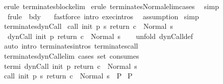 \begin{isabellebody}
\isamarkupfalse%
\ {\isacharparenleft}erule\ terminates{\isacharunderscore}block{\isacharunderscore}elim{\isacharparenright}\isanewline
{}\isamarkupfalse%
\ {\isacharparenleft}erule\ terminates{\isacharunderscore}Normal{\isacharunderscore}elim{\isacharunderscore}cases{\isacharparenright}\isanewline
{}\isamarkupfalse%
\ \ simp\isanewline
{}\isamarkupfalse%
\ \ {\isacharparenleft}frule\ {\isacharparenleft}{}{\isacharparenright}\ bdy{\isacharparenright}\isanewline
{}\isamarkupfalse%
\ \ \ {\isacharparenleft}fastforce\ intro{\isacharcolon}\ exec{\isachardot}intros{\isacharparenright}\isanewline
{}\isamarkupfalse%
\ \ assumption\isanewline
{}\isamarkupfalse%
\ simp\isanewline
{}\isamarkupfalse%
%
\endisatagproof
{\isafoldproof}%
%
\isadelimproof
\isanewline
%
\endisadelimproof
\isanewline
{}\isamarkupfalse%
\ terminates{\isacharunderscore}dynCall{\isacharcolon}\ \isanewline
{\isachardoublequoteopen}{\isasymlbrakk}{\isasymGamma}{\isasymturnstile}call\ init\ {\isacharparenleft}p\ s{\isacharparenright}\ return\ c\ {\isasymdown}\ Normal\ s{\isasymrbrakk}\isanewline
\ {\isasymLongrightarrow}\ {\isasymGamma}{\isasymturnstile}dynCall\ init\ p\ return\ c\ {\isasymdown}\ Normal\ s{\isachardoublequoteclose}\isanewline
%
\isadelimproof
\ \ %
\endisadelimproof
%
\isatagproof
{}\isamarkupfalse%
\ {\isacharparenleft}unfold\ dynCall{\isacharunderscore}def{\isacharparenright}\isanewline
\ \ \isamarkupfalse%
\ {\isacharparenleft}auto\ intro{\isacharcolon}\ terminates{\isachardot}intros\ terminates{\isacharunderscore}call{\isacharparenright}\isanewline
\ \ \isamarkupfalse%
%
\endisatagproof
{\isafoldproof}%
%
\isadelimproof
\isanewline
%
\endisadelimproof
\isanewline
{}\isamarkupfalse%
\ terminates{\isacharunderscore}dynCall{\isacharunderscore}elim\ {\isacharbrackleft}cases\ set{\isacharcomma}\ consumes\ {}{\isacharbrackright}{\isacharcolon}\isanewline
{}\ termi{\isacharcolon}\ {\isachardoublequoteopen}{\isasymGamma}{\isasymturnstile}dynCall\ init\ p\ return\ c\ {\isasymdown}\ Normal\ s{\isachardoublequoteclose}\isanewline
{}\ {\isachardoublequoteopen}{\isasymlbrakk}{\isasymGamma}{\isasymturnstile}call\ init\ {\isacharparenleft}p\ s{\isacharparenright}\ return\ c\ {\isasymdown}\ Normal\ s{\isasymrbrakk}\ {\isasymLongrightarrow}\ P{\isachardoublequoteclose}\isanewline
{}\ P\isanewline
%
\isadelimproof

\end{isabellebody}
